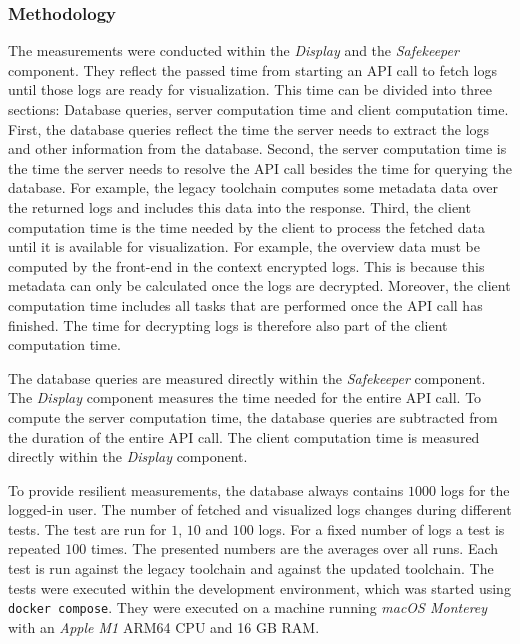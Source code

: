 \documentclass[../main.tex]{subfiles}
\begin{document}
\subsubsection{Methodology}

The measurements were conducted within the \emph{Display} and the \emph{Safekeeper} component.
They reflect the passed time from starting an API call to fetch logs until those logs are ready for visualization.
This time can be divided into three sections: Database queries, server computation time and client computation time.
First, the database queries reflect the time the server needs to extract the logs and other information from the database.
Second, the server computation time is the time the server needs to resolve the API call besides the time for querying the database.
For example, the legacy toolchain computes some metadata data over the returned logs and includes this data into the response.
Third, the client computation time is the time needed by the client to process the fetched data until it is available for visualization.
For example, the overview data must be computed by the front-end in the context encrypted logs.
This is because this metadata can only be calculated once the logs are decrypted.
Moreover, the client computation time includes all tasks that are performed once the API call has finished.
The time for decrypting logs is therefore also part of the client computation time.

The database queries are measured directly within the \emph{Safekeeper} component.
The \emph{Display} component measures the time needed for the entire API call.
To compute the server computation time, the database queries are subtracted from the duration of the entire API call.
The client computation time is measured directly within the \emph{Display} component.

To provide resilient measurements, the database always contains $1000$ logs for the logged-in user.
The number of fetched and visualized logs changes during different tests.
The test are run for $1$, $10$ and $100$ logs.
For a fixed number of logs a test is repeated $100$ times.
The presented numbers are the averages over all runs.
Each test is run against the legacy toolchain and against the updated toolchain.
The tests were executed within the development environment, which was started using \verb|docker compose|.
They were executed on a machine running \emph{macOS Monterey} with an \emph{Apple M1} ARM64 CPU and 16 GB RAM.
\end{document}
